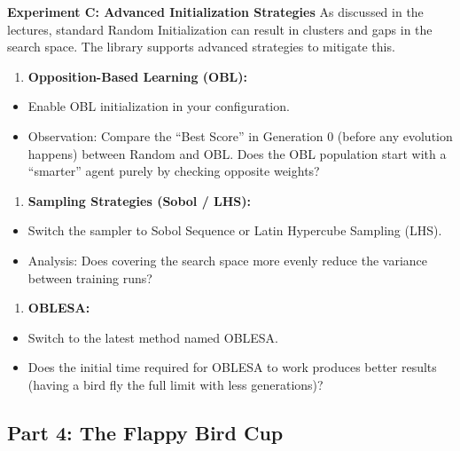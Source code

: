 \documentclass[
  12pt,
]{article}
\providecommand{\tightlist}{%
  \setlength{\itemsep}{0pt}\setlength{\parskip}{0pt}}
\begin{document}
\textbf{Experiment C: Advanced Initialization Strategies} As discussed
in the lectures, standard Random Initialization can result in clusters
and gaps in the search space. The library supports advanced strategies
to mitigate this.

\begin{enumerate}
\def\labelenumi{\arabic{enumi}.}
\tightlist
\item
  \textbf{Opposition-Based Learning (OBL):}
\end{enumerate}

\begin{itemize}
\tightlist
\item
  Enable OBL initialization in your configuration.
\item
  Observation: Compare the ``Best Score'' in Generation 0 (before any
  evolution happens) between Random and OBL. Does the OBL population
  start with a ``smarter'' agent purely by checking opposite weights?
\end{itemize}

\begin{enumerate}
\def\labelenumi{\arabic{enumi}.}
\setcounter{enumi}{1}
\tightlist
\item
  \textbf{Sampling Strategies (Sobol / LHS):}
\end{enumerate}

\begin{itemize}
\tightlist
\item
  Switch the sampler to Sobol Sequence or Latin Hypercube Sampling
  (LHS).
\item
  Analysis: Does covering the search space more evenly reduce the
  variance between training runs?
\end{itemize}

\begin{enumerate}
\def\labelenumi{\arabic{enumi}.}
\setcounter{enumi}{2}
\tightlist
\item
  \textbf{OBLESA:}
\end{enumerate}

\begin{itemize}
\tightlist
\item
  Switch to the latest method named OBLESA.
\item
  Does the initial time required for OBLESA to work produces better
  results (having a bird fly the full limit with less generations)?
\end{itemize}

\subsection{Part 4: The Flappy Bird
Cup}\label{part-4-the-flappy-bird-cup}
\end{document}
